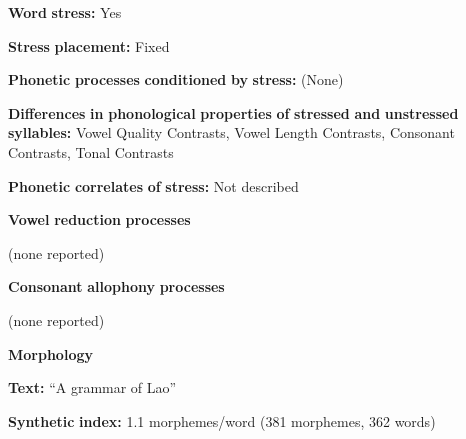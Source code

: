 \begin{styleBody}
\textbf{Word} \textbf{stress:} Yes
\end{styleBody}

\begin{styleBody}
\textbf{Stress} \textbf{placement:} Fixed
\end{styleBody}

\begin{styleBody}
\textbf{Phonetic} \textbf{processes} \textbf{conditioned} \textbf{by} \textbf{stress:} (None)
\end{styleBody}

\begin{styleBody}
\textbf{Differences} \textbf{in} \textbf{phonological} \textbf{properties} \textbf{of} \textbf{stressed} \textbf{and} \textbf{unstressed} \textbf{syllables:} Vowel Quality Contrasts, Vowel Length Contrasts, Consonant Contrasts, Tonal Contrasts
\end{styleBody}

\begin{styleBody}
\textbf{Phonetic} \textbf{correlates} \textbf{of} \textbf{stress:} Not described
\end{styleBody}

\begin{styleBody}
\textbf{Vowel} \textbf{reduction} \textbf{processes}
\end{styleBody}

\begin{styleBody}
(none reported)
\end{styleBody}

\begin{styleBody}
\textbf{Consonant} \textbf{allophony} \textbf{processes}
\end{styleBody}

\begin{styleBody}
(none reported)
\end{styleBody}

\begin{styleBody}
\textbf{Morphology}
\end{styleBody}

\begin{styleBody}
\textbf{Text:} “A grammar of Lao” \citep[488-497]{Enfield2007}
\end{styleBody}

\begin{styleBody}
\textbf{Synthetic} \textbf{index:} 1.1 morphemes/word (381 morphemes, 362 words)
\end{styleBody}

